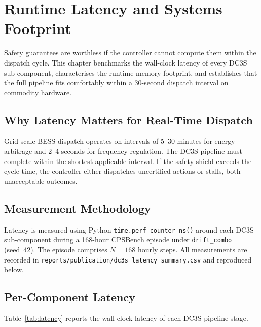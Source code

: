 
\chapter{Runtime Latency and Systems Footprint}
\label{ch:latency}

Safety guarantees are worthless if the controller cannot compute them
within the dispatch cycle.  This chapter benchmarks the wall-clock
latency of every DC3S sub-component, characterises the runtime memory
footprint, and establishes that the full pipeline fits comfortably
within a 30-second dispatch interval on commodity hardware.

\section{Why Latency Matters for Real-Time Dispatch}

Grid-scale BESS dispatch operates on intervals of 5--30 minutes for
energy arbitrage and 2--4 seconds for frequency regulation.  The DC3S
pipeline must complete within the shortest applicable interval.  If the
safety shield exceeds the cycle time, the controller either dispatches
uncertified actions or stalls, both unacceptable outcomes.

\section{Measurement Methodology}

Latency is measured using Python \texttt{time.perf\_counter\_ns()} around
each DC3S sub-component during a 168-hour CPSBench episode under
\texttt{drift\_combo} (seed~42).  The episode comprises $N=168$ hourly
steps.  All measurements are recorded in
\texttt{reports/publication/dc3s\_latency\_summary.csv} and reproduced
below.

\section{Per-Component Latency}

Table~\ref{tab:latency} reports the wall-clock latency of each DC3S
pipeline stage.

